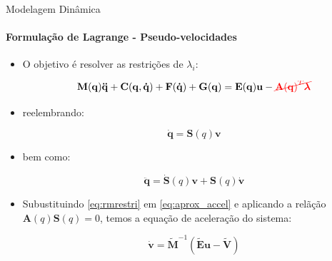 \documentclass[aspectratio=169]{beamer}
\begin{document}
\begin{frame}{Modelagem Dinâmica}
    \framesubtitle{Formulação de Lagrange - Pseudo-velocidades}

    \begin{itemize}
        \item O objetivo é resolver as restrições de $\lambda_i$:

              \begin{equation}\label{eq:rmrestri}
                  \mathbf{M(q)\ddot{q}+ C(q, \dot{q})+ F(\dot{q})+G(q) = E(q)u} - \textcolor{red}{\cancel{\mathbf{A}\mathbf{(q)}^T\boldsymbol{\lambda}}}
              \end{equation}

        \item reelembrando:

              \begin{equation*}
                  \mathbf{\dot{q}} = \mathbf{S}(q)\mathbf{v}
              \end{equation*}

        \item bem como:

              \begin{equation}\label{eq:aprox_accel}
                  \mathbf{\ddot{q}} = \mathbf{\dot{S}}(q)\mathbf{v} + \mathbf{S}(q)\mathbf{\dot{v}}
              \end{equation}

        \item Subustituindo \eqref{eq:rmrestri} em \eqref{eq:aprox_accel} e aplicando a relãção $\mathbf{A}(q)\mathbf{S}(q)=0$, temos a equação de aceleração do sistema:

              \begin{equation}\label{eq:pseudovelo}
                  \mathbf{\dot{v}} = \mathbf{\tilde{M}}^{-1}\left(\mathbf{\tilde{E}u - \tilde{V}} \right)
              \end{equation}
    \end{itemize}
\end{frame}
\end{document}
